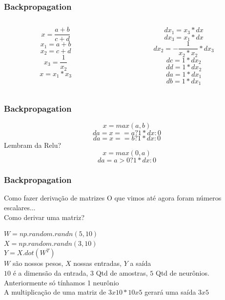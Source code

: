 \documentclass{beamer}
\begin{document}
\begin{frame}
	\frametitle{Backpropagation}
	\begin{example}
	\begin{columns}
		\begin{column}{0.35\textwidth}
			
				$$x = \frac{a+ b}{c +d}$$
				$$x_1 = a + b$$
				$$x_2 = c + d$$
				$$x_3 = \frac{1}{x_2} $$
				$$x = x_1 * x_3$$
		\end{column}
		\begin{column}{0.35\textwidth}
			$$dx_1 = x_3 * dx$$
			$$dx_3 = x_1 * dx$$
			$$dx_2 = - \frac{1}{x_2 * x_2}*dx_3$$
			$$dc = 1 * dx_2$$
			$$dd = 1 * dx_2$$
			$$da = 1 * dx_1$$
			$$db = 1 * dx_1$$
		\end{column}
	\end{columns}
\end{example}
\end{frame}
\begin{frame}
	\frametitle{Backpropagation}
	\begin{example}
		$$x = max(a, b)$$
		$$da = x == a ? 1 * dx : 0$$
		$$da = x == b ? 1 * dx : 0$$
		Lembram da Relu?
		$$x = max(0, a)$$
		$$da = a> 0 ? 1 * dx : 0$$
	\end{example}
\end{frame}
\begin{frame}
	\frametitle{Backpropagation}
	\begin{block}{Como fazer derivação de matrizes}
		O que vimos até agora foram números escalares... \\
		Como derivar uma matriz?
	\end{block}
	\begin{example}	
		
		$W = np.random.randn(5, 10)$ \\
		$X = np.random.randn(3, 10)$ \\
		$Y = X.dot(W^T)$ \\
		$W$ são nossos pesos, $X$ nossas entradas, $Y$ a saída \\
		$10$ é a dimensão da entrada, $3$ Qtd de amostras, $5$ Qtd de neurônios. \\
		Anteriormente só tínhamos 1 neurônio \\ 
		A multiplicação de uma matriz de $3x10 * 10x5$ gerará uma saída $3x5$
	\end{example}
\end{frame}
\end{document}
